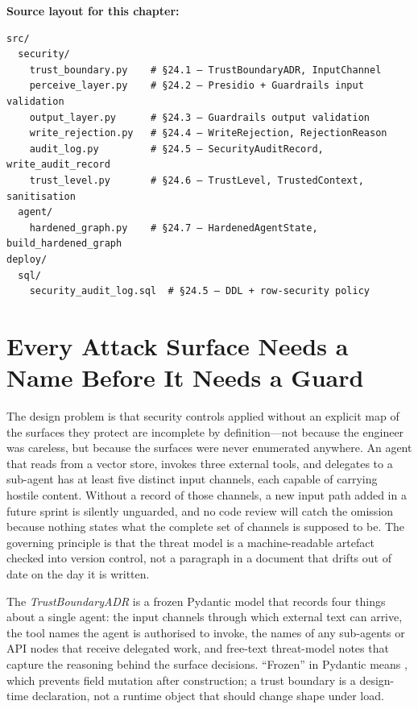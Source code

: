 \medskip
\noindent\textbf{Source layout for this chapter:}
\begin{verbatim}
src/
  security/
    trust_boundary.py    # §24.1 — TrustBoundaryADR, InputChannel
    perceive_layer.py    # §24.2 — Presidio + Guardrails input validation
    output_layer.py      # §24.3 — Guardrails output validation
    write_rejection.py   # §24.4 — WriteRejection, RejectionReason
    audit_log.py         # §24.5 — SecurityAuditRecord, write_audit_record
    trust_level.py       # §24.6 — TrustLevel, TrustedContext, sanitisation
  agent/
    hardened_graph.py    # §24.7 — HardenedAgentState, build_hardened_graph
deploy/
  sql/
    security_audit_log.sql  # §24.5 — DDL + row-security policy
\end{verbatim}


\section{Every Attack Surface Needs a Name Before It Needs a Guard}
\label{sec:sec-adr}

The design problem is that security controls applied without an explicit
map of the surfaces they protect are incomplete by definition---not
because the engineer was careless, but because the surfaces were never
enumerated anywhere. An agent that reads from a vector store, invokes
three external tools, and delegates to a sub-agent has at least five
distinct input channels, each capable of carrying hostile content.
Without a record of those channels, a new input path added in a future
sprint is silently unguarded, and no code review will catch the
omission because nothing states what the complete set of channels is
supposed to be. The governing principle is that the threat model is a
machine-readable artefact checked into version control, not a paragraph
in a document that drifts out of date on the day it is written.

The \emph{TrustBoundaryADR} is a frozen Pydantic model that records
four things about a single agent: the input channels through which
external text can arrive, the tool names the agent is authorised to
invoke, the names of any sub-agents or  API nodes that
receive delegated work, and free-text threat-model notes that capture
the reasoning behind the surface decisions. ``Frozen'' in Pydantic
means , which prevents field
mutation after construction; a trust boundary is a design-time
declaration, not a runtime object that should change shape under load.

